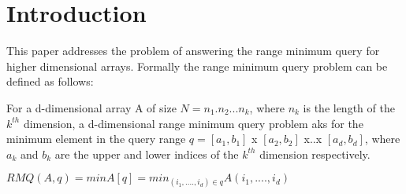 \section{Introduction}
This paper\cite{p10} addresses the problem of answering the range minimum query for higher dimensional arrays. Formally the range minimum query problem can be defined as follows:\par
For a d-dimensional array A of size $N = n_1.n_2...n_k$, where $n_k$ is the length of the $k^{th}$ dimension, a d-dimensional range minimum query problem aks for the minimum element in the query range $q = [a_1, b_1]$ x $[a_2, b_2]$ x..x $[a_d, b_d]$, where $a_k$ and $b_k$ are the upper and lower indices of the $k^{th}$ dimension respectively.
\begin{center}
\begin{math}
RMQ(A, q) = min A[q] = min_{(i_1,....,i_d)\in q}  A(i_1,....,i_d)
\end{math}
\end{center}

